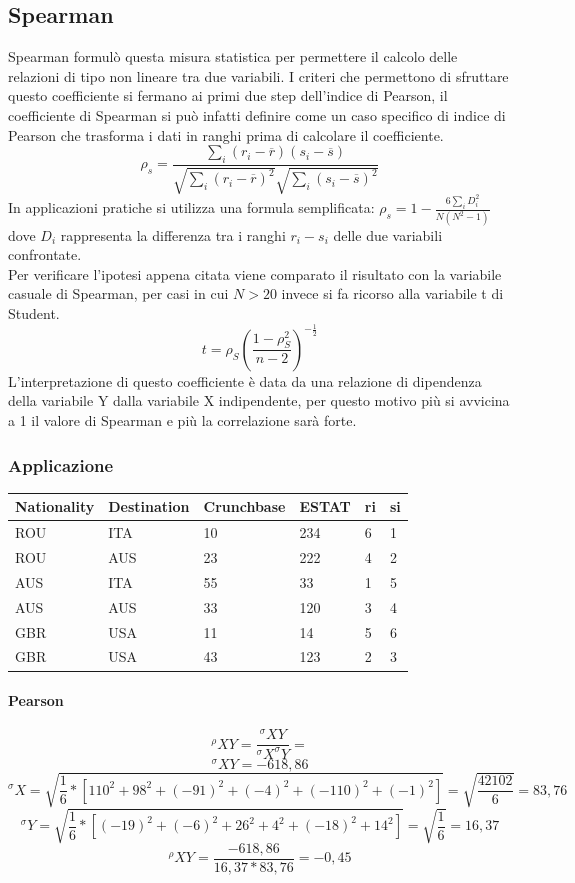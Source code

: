 \subsection{Spearman}
Spearman formulò questa misura statistica per permettere il calcolo delle relazioni di tipo non lineare tra due variabili. I criteri che permettono di sfruttare questo coefficiente si fermano ai primi due step dell'indice di Pearson, il coefficiente di Spearman si può infatti definire come un caso specifico di indice di Pearson che trasforma i dati in ranghi prima di calcolare il coefficiente. 
\[\rho _{s}={\frac {\sum _{i}(r_{i}-{\overline {r}})(s_{i}-{\overline {s}})}{{\sqrt {\sum _{i}(r_{i}-{\overline {r}})^{2}}}{\sqrt {\sum _{i}(s_{i}-{\overline {s}})^{2}}}}}\]
In applicazioni pratiche si utilizza una formula semplificata: \(\rho _{s}=1-{\frac {6\sum _{i}D_{i}^{2}}{N(N^{2}-1)}}\) dove \(D_i\) rappresenta la differenza tra i ranghi \(r_{i}-s_{i}\) delle due variabili confrontate. \\
Per verificare l'ipotesi appena citata viene comparato il risultato con la variabile casuale di Spearman, per casi in cui \(N > 20\) invece si fa ricorso alla variabile t di Student. 
\[t = \rho_S ({\frac{1-\rho_S^2}{n-2}})^{-\frac{1}{2}}\]
L'interpretazione di questo coefficiente è data da una relazione di dipendenza della variabile Y dalla variabile X indipendente, per questo motivo più si avvicina a 1 il valore di Spearman e più la correlazione sarà forte.
\subsubsection{Applicazione}
\begin{tabular}{ ||p{2cm}|p{2cm}|p{2cm}|p{2cm}|p{2cm}|p{2cm}||  }
 \hline
 Nationality & Destination & Crunchbase & ESTAT & ri & si\\ [0.5ex] 
 \hline\hline\hline
 ROU& ITA& 10& 234& 6& 1\\
 \hline
 ROU& AUS& 23& 222& 4& 2\\
 \hline
 AUS& ITA& 55& 33& 1& 5\\
 \hline
 AUS& AUS& 33& 120& 3& 4\\
 \hline
 GBR& USA& 11& 14& 5& 6\\
 \hline
 GBR& USA& 43& 123& 2& 3\\
 \hline
\end{tabular}
\paragraph{Pearson}
\[^\rho{XY}  = \frac{^\sigma{XY}}{^\sigma{X} ^\sigma{Y}} = \]
\[^\sigma{XY}  = -618,86\]
\[^\sigma{X} = \sqrt{\frac{1}{6}*[110^2+98^2+(-91)^2+(-4)^2+(-110)^2+(-1)^2]} = \sqrt{\frac{42102}{6}} = 83,76\]
\[^\sigma{Y} = \sqrt{\frac{1}{6}*[(-19)^2+(-6)^2+26^2+4^2+(-18)^2+14^2]} = \sqrt{\frac{1}{6}} = 16,37\]
\[^\rho{XY} = \frac{-618,86}{16,37*83,76} = -0,45\]
